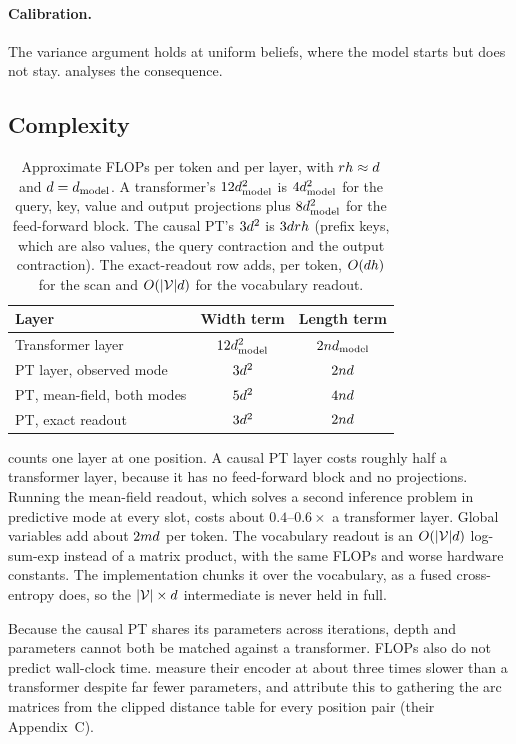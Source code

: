 \paragraph{Calibration.}
The variance argument holds at uniform beliefs, where the model starts but does not stay.
 analyses the consequence.

\subsection{Complexity}
\label{app:complexity}

\begin{table}[t]
\centering
\small
\begin{tabular}{@{}lcc@{}}
\toprule
Layer & Width term & Length term \\
\midrule
Transformer layer          & $12d_{\text{model}}^2$ & $2nd_{\text{model}}$ \\
PT layer, observed mode    & $3d^2$    & $2nd$   \\
PT, mean-field, both modes & $5d^2$    & $4nd$   \\
PT, exact readout          & $3d^2$    & $2nd$   \\
\bottomrule
\end{tabular}
\caption{Approximate FLOPs per token and per layer, with $rh\approx d$ and
$d=d_{\text{model}}$. A transformer's $12d_{\text{model}}^2$ is $4d_{\text{model}}^2$ for the query, key, value and
output projections plus $8d_{\text{model}}^2$ for the feed-forward block. The causal PT's $3d^2$ is
$3drh$ (prefix keys, which are also values, the query contraction and the output
contraction). The exact-readout row adds, per token, $O(dh)$ for the scan and
$O(|\mathcal{V}|d)$ for the vocabulary readout.}
\label{tab:complexity}
\end{table}

 counts one layer at one position. A causal PT layer costs roughly half a
transformer layer, because it has no feed-forward block and no projections. Running the
mean-field readout, which solves a second inference problem in predictive mode at every slot,
costs about $0.4$--$0.6\times$ a transformer layer. Global variables add about $2md$
per token. The vocabulary readout is an $O(|\mathcal{V}|d)$ log-sum-exp instead of a matrix
product, with the same FLOPs and worse hardware constants. The implementation chunks it over the vocabulary,
as a fused cross-entropy does, so the $|\mathcal{V}|\times d$ intermediate is never held in full.

Because the causal PT shares its parameters across iterations, depth and parameters cannot both
be matched against a transformer. FLOPs also do not predict wall-clock time. \citet{wu2023probabilistic}
measure their encoder at about three times slower than a transformer despite far fewer
parameters, and attribute this to gathering the arc matrices from the clipped distance table for
every position pair (their Appendix~C).
